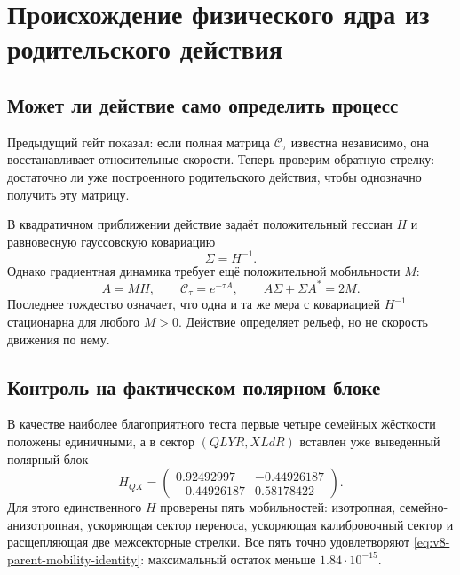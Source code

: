 \chapter{Происхождение физического ядра из родительского действия}
\label{ch:v8-physical-correlation-kernel-parent-action-origin-gate}

\section{Может ли действие само определить процесс}

Предыдущий гейт показал: если полная матрица $\mathcal C_\tau$ известна
независимо, она восстанавливает относительные скорости. Теперь проверим
обратную стрелку: достаточно ли уже построенного родительского действия,
чтобы однозначно получить эту матрицу.

В квадратичном приближении действие задаёт положительный гессиан $H$ и
равновесную гауссовскую ковариацию
\begin{equation}
 \Sigma=H^{-1}.
 \label{eq:v8-parent-equilibrium-covariance}
\end{equation}
Однако градиентная динамика требует ещё положительной мобильности $M$:
\begin{equation}
 A=MH,
 \qquad
 \mathcal C_\tau=e^{-\tau A},
 \qquad
 A\Sigma+\Sigma A^{*}=2M.
 \label{eq:v8-parent-mobility-identity}
\end{equation}
Последнее тождество означает, что одна и та же мера с ковариацией $H^{-1}$
стационарна для любого $M>0$. Действие определяет рельеф, но не скорость
движения по нему.

\section{Контроль на фактическом полярном блоке}

В качестве наиболее благоприятного теста первые четыре семейных жёсткости
положены единичными, а в сектор $(QLYR,XLdR)$ вставлен уже выведенный
полярный блок
\begin{equation}
 H_{QX}=
 \begin{pmatrix}
 0.92492997&-0.44926187\\
 -0.44926187&0.58178422
 \end{pmatrix}.
 \label{eq:v8-parent-qx-hessian}
\end{equation}
Для этого единственного $H$ проверены пять мобильностей: изотропная,
семейно-анизотропная, ускоряющая сектор переноса, ускоряющая калибровочный сектор и
расщепляющая две межсекторные стрелки. Все пять точно удовлетворяют
\eqref{eq:v8-parent-mobility-identity}: максимальный остаток меньше
$1.84\cdot10^{-15}$.

